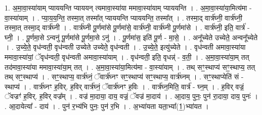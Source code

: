 \documentclass[17pt]{extarticle}
\begin{document}
1. अ॒मा॒वा॒स्या॑याम् प्याययन्ति प्याययन् त्यमावा॒स्या॑या ममावा॒स्या॑याम् प्याययन्ति । . अ॒मा॒वा॒स्या॑या॒मित्य॑मा - वा॒स्या॑याम् । . प्या॒य॒य॒न्ति॒ तस्मा॒त् तस्मा᳚त् प्याययन्ति प्याययन्ति॒ तस्मा᳚त् । . तस्मा॒द् वार्त्र॑घ्नी॒ वार्त्र॑घ्नी॒ तस्मा॒त् तस्मा॒द् वार्त्र॑घ्नी । . वार्त्र॑घ्नी पू॒र्णमा॑से पू॒र्णमा॑से॒ वार्त्र॑घ्नी॒ वार्त्र॑घ्नी पू॒र्णमा॑से । . वार्त्र॑घ्नी॒ इति॒ वार्त्र॑ - घ्नी॒ । . पू॒र्णमा॒से ऽन्वनु॑ पू॒र्णमा॑से पू॒र्णमा॒से ऽनु॑ । . पू॒र्णमा॑स॒ इति॑ पू॒र्ण - मा॒से॒ । . अनू᳚च्येते उच्येते॒ अन्वनू᳚च्येते । . उ॒च्ये॒ते॒ वृध॑न्वती॒ वृध॑न्वती उच्येते उच्येते॒ वृध॑न्वती । . उ॒च्ये॒ते॒ इत्यु॑च्येते । . वृध॑न्वती अमावा॒स्या॑या ममावा॒स्या॑यां॒ ॅवृध॑न्वती॒ वृध॑न्वती अमावा॒स्या॑याम् । . वृध॑न्वती॒ इति॒ वृधन्न्॑ - व॒ती॒ । . अ॒मा॒वा॒स्या॑या॒म् तत् तद॑मावा॒स्या॑या ममावा॒स्या॑या॒म् तत् । . अ॒मा॒वा॒स्या॑या॒मित्य॑मा - वा॒स्या॑याम् । . तथ् सꣳ॒॒स्थाप्य॑ सꣳ॒॒स्थाप्य॒ तत् तथ् सꣳ॒॒स्थाप्य॑ । . सꣳ॒॒स्थाप्य॒ वार्त्र॑घ्नं॒ ॅवार्त्र॑घ्नꣳ सꣳ॒॒स्थाप्य॑ सꣳ॒॒स्थाप्य॒ वार्त्र॑घ्नम् । . सꣳ॒॒स्थाप्येति॑ सं - स्थाप्य॑ । . वार्त्र॑घ्नꣳ ह॒विर्. ह॒विर् वार्त्र॑घ्नं॒ ॅवार्त्र॑घ्नꣳ ह॒विः । . वार्त्र॑घ्न॒मिति॒ वार्त्र॑ - घ्न॒म् । . ह॒विर् वज्रं॒ ॅवज्रꣳ॑ ह॒विर्. ह॒विर् वज्र᳚म् । . वज्र॑ मा॒दाया॒ दाय॒ वज्रं॒ ॅवज्र॑ मा॒दाय॑ । . आ॒दाय॒ पुनः॒ पुन॑ रा॒दाया॒ दाय॒ पुनः॑ । . आ॒दायेत्या᳚ - दाय॑ । . पुन॑ र॒भ्य॑भि पुनः॒ पुन॑ र॒भि । . अ॒भ्या॑यता यता॒भ्या᳚(1॒)भ्या॑यत । \newline
\end{document}
